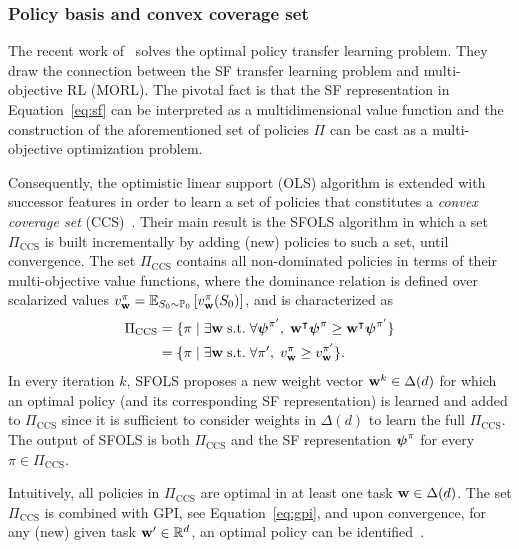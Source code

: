 \subsubsection{Policy basis and convex coverage set} The recent work of~\citep{Alegre2022} solves the optimal policy transfer learning problem. They draw the connection between the SF transfer learning problem and multi-objective RL (MORL). The pivotal fact is that the SF representation in Equation~\eqref{eq:sf} can be interpreted as a multidimensional value function and the construction of the aforementioned set of policies $\Pi$ can be cast as a multi-objective optimization problem.
 
 Consequently, the optimistic linear support (OLS) algorithm is extended with successor features in order to learn a set of policies that constitutes a \textit{convex coverage set} (CCS)~\citep{Roijers2015}. Their main result is the SFOLS algorithm %
 in which a set $\Pi_\text{CCS}$ is built incrementally by adding (new) policies to such a set, until convergence. The set $\Pi_\text{CCS}$ contains all non-dominated policies in terms of their multi-objective value functions, where the dominance relation is defined over scalarized values ${v^\pi_{\mathbf{w}} = \mathbb{E}_{S_0\sim\mathbb{P}_0}\left[v^\pi_{\mathbf{w}}(S_0)\right]}$, and is characterized as
\begin{align}
  \Pi_\text{CCS} &= \{\pi\;\lvert\;\exists\mathbf{w}\;\text{s.t.}\;\forall {\boldsymbol{\mathbf{\psi}}}^{\pi'},\; \mathbf{w}^\intercal {\boldsymbol{\mathbf{\psi}}}^\pi {\;\geq\;} \mathbf{w}^\intercal{\boldsymbol{\mathbf{\psi}}}^{\pi'} \} \nonumber\\
  &= \{ \pi \;\lvert\;\exists\mathbf{w}\;\text{s.t.}\;\forall {\pi'},\; {v^\pi_{\mathbf{w}}}{\;\geq\;} {v^{\pi'}_{\mathbf{w}}}\}.
\end{align} 
In every iteration $k$, SFOLS proposes a new weight vector $\mathbf{w}^k\in\Delta(d)$ for which an optimal policy (and its corresponding SF representation) is learned and added to $\Pi_\text{CCS}$ since it is sufficient to consider weights in $\Delta(d)$ to learn the full $\Pi_\text{CCS}$. The output of SFOLS is both $\Pi_\text{CCS}$ and the SF representation $\boldsymbol{\mathbf{\psi}}^\pi$ for every $\pi\in\Pi_\text{CCS}$.
 
Intuitively, all policies in $\Pi_\text{CCS}$ are optimal in at least one task $\mathbf{w} \in \Delta(d)$.
The set $\Pi_\text{CCS}$ is combined with GPI, see Equation~\eqref{eq:gpi}, and upon convergence, for any (new) given task $\mathbf{w}'\in\mathbb{R}^d$, an optimal policy can be identified~\citep[cf. Theorem 2]{Alegre2022}.


